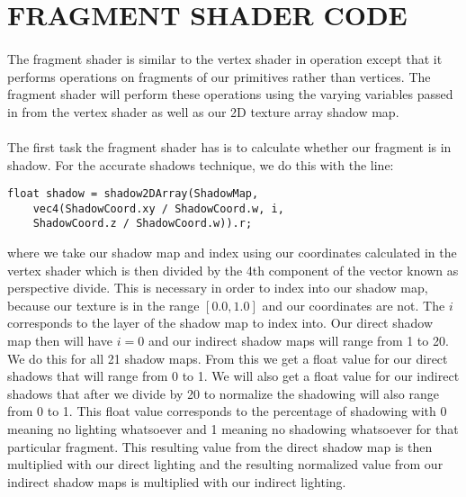 \section{FRAGMENT SHADER CODE}\label{sec:fragShader}
\paragraph{}
The fragment shader is similar to the vertex shader in operation except that it performs operations on fragments of our primitives rather than vertices.  The fragment shader will perform these operations using the varying variables passed in from the vertex shader as well as our 2D texture array shadow map.

\paragraph{}
The first task the fragment shader has is to calculate whether our fragment is in shadow.  For the accurate shadows technique, we do this with the line:

\begin{lstlisting}
float shadow = shadow2DArray(ShadowMap, 
	vec4(ShadowCoord.xy / ShadowCoord.w, i, 
	ShadowCoord.z / ShadowCoord.w)).r;
\end{lstlisting}

where we take our shadow map and index using our coordinates calculated in the vertex shader which is then divided by the 4th component of the vector known as perspective divide.  This is necessary in order to index into our shadow map, because our texture is in the range $[0.0, 1.0]$ and our coordinates are not.  The $i$ corresponds to the layer of the shadow map to index into.  Our direct shadow map then will have $i=0$ and our indirect shadow maps will range from 1 to 20.  We do this for all 21 shadow maps.  From this we get a float value for our direct shadows that will range from 0 to 1.  We will also get a float value for our indirect shadows that after we divide by 20 to normalize the shadowing will also range from 0 to 1.  This float value corresponds to the percentage of shadowing with 0 meaning no lighting whatsoever and 1 meaning no shadowing whatsoever for that particular fragment.  This resulting value from the direct shadow map is then multiplied with our direct lighting and the resulting normalized value from our indirect shadow maps is multiplied with our indirect lighting.


